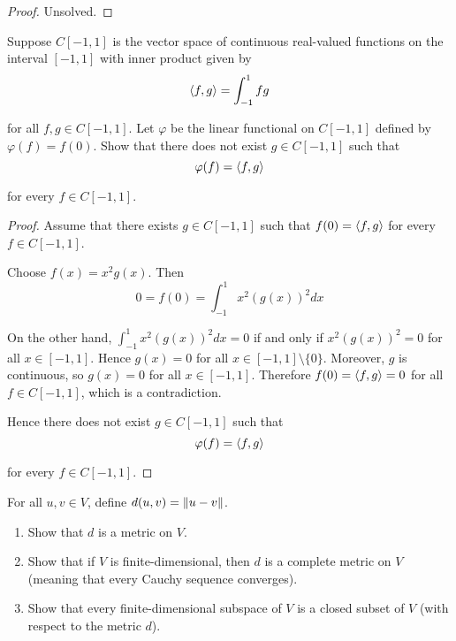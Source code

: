 \begin{proof}
    Unsolved.
\end{proof}
\newpage

\begin{exercise}
    Suppose $C[-1, 1]$ is the vector space of continuous real-valued functions
    on the interval $[-1, 1]$ with inner product given by
    \[
        \left\langle{f, g}\right\rangle = \int^{1}_{-1} fg
    \]

    for all $f, g\in C[-1, 1]$. Let $\varphi$ be the linear functional on $C[-1, 1]$ defined by $\varphi(f) = f(0)$. Show that there does not exist $g\in C[-1, 1]$ such that
    \[
        \varphi(f) = \left\langle{f, g}\right\rangle
    \]

    for every $f\in C[-1, 1]$.
\end{exercise}

\begin{proof}
    Assume that there exists $g\in C[-1, 1]$ such that $f(0) = \left\langle{f, g}\right\rangle$ for every $f\in C[-1, 1]$.

    Choose $f(x) = x^{2}g(x)$. Then
    \[
        0 = f(0) = \int^{1}_{-1}x^{2}{(g(x))}^{2}dx
    \]

    On the other hand, $\int^{1}_{-1}x^{2}{(g(x))}^{2}dx = 0$ if and only if $x^{2}{(g(x))}^{2} = 0$ for all $x\in [-1, 1]$. Hence $g(x) = 0$ for all $x\in [-1,1]\setminus\{0\}$. Moreover, $g$ is continuous, so $g(x) = 0$ for all $x\in [-1,1]$. Therefore $f(0) = \left\langle{f, g}\right\rangle = 0$ for all $f\in C[-1, 1]$, which is a contradiction.

    Hence there does not exist $g\in C[-1, 1]$ such that
    \[
        \varphi(f) = \left\langle{f, g}\right\rangle
    \]

    for every $f\in C[-1, 1]$.
\end{proof}
\newpage

\begin{exercise}\label{chapter6:sectionB:exercise23}
    For all $u, v \in V$, define $d(u, v) = \left\Vert{u - v}\right\Vert$.
    \begin{enumerate}[label={(\alph*)}]
        \item Show that $d$ is a metric on $V$.
        \item Show that if $V$ is finite-dimensional, then $d$ is a complete metric on $V$ (meaning that every Cauchy sequence converges).
        \item Show that every finite-dimensional subspace of $V$ is a closed subset of $V$ (with respect to the metric $d$).
    \end{enumerate}
\end{exercise}

